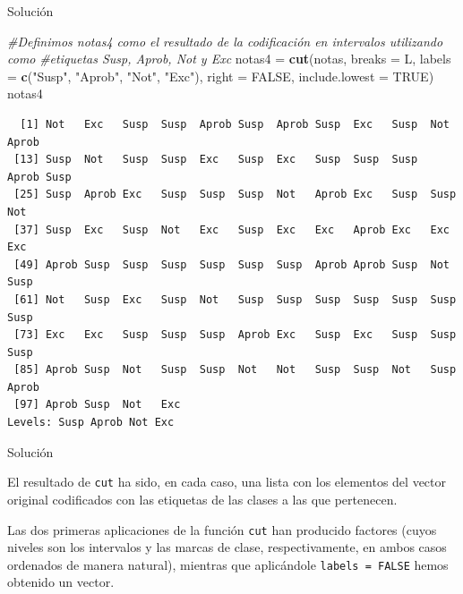 \documentclass[
  ignorenonframetext,
]{beamer}
\newenvironment{Shaded}{\begin{snugshade}}{\end{snugshade}}
\newcommand{\CommentTok}[1]{\textcolor[rgb]{0.56,0.35,0.01}{\textit{#1}}}
\newcommand{\DataTypeTok}[1]{\textcolor[rgb]{0.13,0.29,0.53}{#1}}
\newcommand{\KeywordTok}[1]{\textcolor[rgb]{0.13,0.29,0.53}{\textbf{#1}}}
\newcommand{\NormalTok}[1]{#1}
\newcommand{\OtherTok}[1]{\textcolor[rgb]{0.56,0.35,0.01}{#1}}
\newcommand{\StringTok}[1]{\textcolor[rgb]{0.31,0.60,0.02}{#1}}
\begin{document}
\begin{frame}[fragile]{Solución}
\protect\hypertarget{soluciuxf3n-20}{}

\begin{Shaded}
\begin{Highlighting}[]
\CommentTok{#Definimos notas4 como el resultado de la codificación en intervalos utilizando como }
\CommentTok{#etiquetas Susp, Aprob, Not y Exc}
\NormalTok{notas4 =}\StringTok{ }\KeywordTok{cut}\NormalTok{(notas, }\DataTypeTok{breaks =}\NormalTok{ L, }\DataTypeTok{labels =} \KeywordTok{c}\NormalTok{(}\StringTok{"Susp"}\NormalTok{, }\StringTok{"Aprob"}\NormalTok{, }\StringTok{"Not"}\NormalTok{, }\StringTok{"Exc"}\NormalTok{), }\DataTypeTok{right =} \OtherTok{FALSE}\NormalTok{, }\DataTypeTok{include.lowest =} \OtherTok{TRUE}\NormalTok{)}
\NormalTok{notas4}
\end{Highlighting}
\end{Shaded}

\begin{verbatim}
  [1] Not   Exc   Susp  Susp  Aprob Susp  Aprob Susp  Exc   Susp  Not   Aprob
 [13] Susp  Not   Susp  Susp  Exc   Susp  Exc   Susp  Susp  Susp  Aprob Susp 
 [25] Susp  Aprob Exc   Susp  Susp  Susp  Not   Aprob Exc   Susp  Susp  Not  
 [37] Susp  Exc   Susp  Not   Exc   Susp  Exc   Exc   Aprob Exc   Exc   Exc  
 [49] Aprob Susp  Susp  Susp  Susp  Susp  Susp  Aprob Aprob Susp  Not   Susp 
 [61] Not   Susp  Exc   Susp  Not   Susp  Susp  Susp  Susp  Susp  Susp  Susp 
 [73] Exc   Exc   Susp  Susp  Susp  Aprob Exc   Susp  Exc   Susp  Susp  Susp 
 [85] Aprob Susp  Not   Susp  Susp  Not   Not   Susp  Susp  Not   Susp  Aprob
 [97] Aprob Susp  Not   Exc  
Levels: Susp Aprob Not Exc
\end{verbatim}

\end{frame}

\begin{frame}[fragile]{Solución}
\protect\hypertarget{soluciuxf3n-21}{}

El resultado de \texttt{cut} ha sido, en cada caso, una lista con los
elementos del vector original codificados con las etiquetas de las
clases a las que pertenecen.

Las dos primeras aplicaciones de la función \texttt{cut} han producido
factores (cuyos niveles son los intervalos y las marcas de clase,
respectivamente, en ambos casos ordenados de manera natural), mientras
que aplicándole \texttt{labels\ =\ FALSE} hemos obtenido un vector.

\end{frame}
\end{document}
